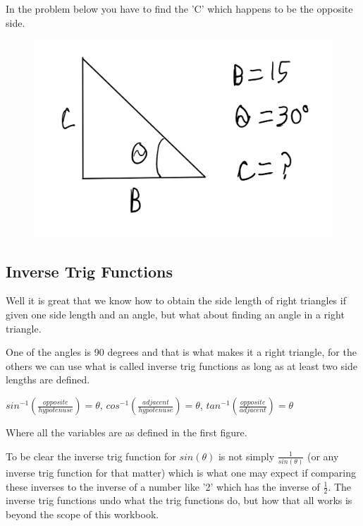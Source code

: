\documentclass[12pt]{article}
\begin{document}
\parbox[][5cm][t]{8cm}{}


In the problem below you have to find the 'C' which happens to be the opposite side.
\begin{figure}[h]
\includegraphics[scale=0.20]{TrigProb3.png}
\end{figure}

\parbox[][2cm][t]{8cm}{}

\subsection{Inverse Trig Functions}

Well it is great that we know how to obtain the side length of right triangles if given one side length and an angle, but what about finding an angle in a right triangle.

One of the angles is 90 degrees and that is what makes it a right triangle, for the others we can use what is called inverse trig functions as long as at least two side lengths are defined.

$sin^{-1}(\frac{opposite}{hypotenuse}) = \theta$,
$cos^{-1}(\frac{adjacent}{hypotenuse}) = \theta$,
$tan^{-1}(\frac{opposite}{adjacent}) = \theta$

Where all the variables are as defined in the first figure.

To be clear the inverse trig function for $sin(\theta)$ is not simply $\frac{1}{sin(\theta)}$ (or any inverse trig function for that matter) which is what one may expect if comparing these inverses to the inverse of a number like '2' which has the inverse of $\frac{1}{2}$. The inverse trig functions undo what the trig functions do, but how that all works is beyond the scope of this workbook.
\end{document}
